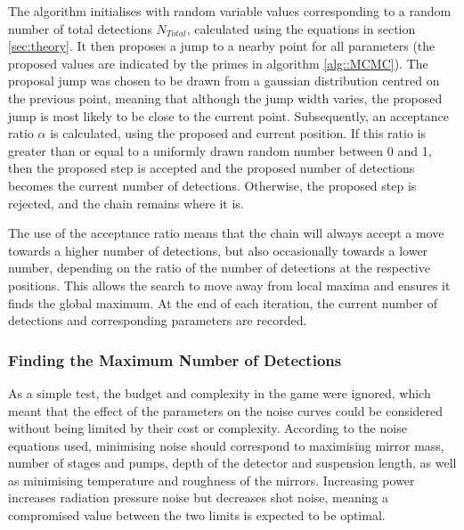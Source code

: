 \documentclass{article}
\begin{document}
The algorithm initialises with random variable values corresponding to a random number of total detections $N_{Total}$, calculated using the equations in section \ref{sec:theory}. It then proposes a jump to a nearby point for all parameters (the proposed values are indicated by the primes in algorithm \ref{alg::MCMC}). The proposal jump was chosen to be drawn from a gaussian distribution centred on the previous point, meaning that although the jump width varies, the proposed jump is most likely to be close to the current point. Subsequently, an acceptance ratio $\alpha$ is calculated, using the proposed and current position. If this ratio is greater than or equal to a uniformly drawn random number between 0 and 1, then the proposed step is accepted and the proposed number of detections becomes the current number of detections. Otherwise, the proposed step is rejected, and the chain remains where it is.

The use of the acceptance ratio means that the chain will always accept a move towards a higher number of detections, but also occasionally towards a lower number, depending on the ratio of the number of detections at the respective positions. This allows the search to move away from local maxima and ensures it finds the global maximum. At the end of each iteration, the current number of detections and corresponding parameters are recorded. 

\subsubsection{Finding the Maximum Number of Detections}
As a simple test, the budget and complexity in the game were ignored, which meant that the effect of the parameters on the noise curves could be considered without being limited by their cost or complexity. According to the noise equations used, minimising noise should correspond to maximising mirror mass, number of stages and pumps, depth of the detector and suspension length, as well as minimising temperature and roughness of the mirrors. Increasing power increases radiation pressure noise but decreases shot noise, meaning a compromised value between the two limits is expected to be optimal. 
\end{document}
